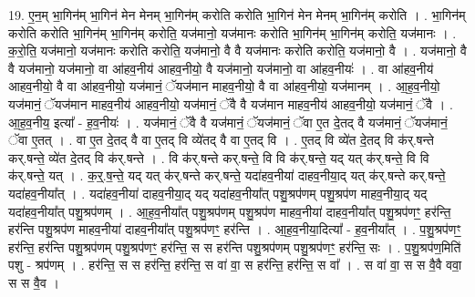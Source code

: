\documentclass[17pt]{extarticle}
\begin{document}
19. ए॒न॒म् भा॒गिन॑म् भा॒गिन॑ मेन मेनम् भा॒गिन॑म् करोति करोति भा॒गिन॑ मेन मेनम् भा॒गिन॑म् करोति । . भा॒गिन॑म् करोति करोति भा॒गिन॑म् भा॒गिन॑म् करोति॒ यज॑मानो॒ यज॑मानः करोति भा॒गिन॑म् भा॒गिन॑म् करोति॒ यज॑मानः । . क॒रो॒ति॒ यज॑मानो॒ यज॑मानः करोति करोति॒ यज॑मानो॒ वै वै यज॑मानः करोति करोति॒ यज॑मानो॒ वै । . यज॑मानो॒ वै वै यज॑मानो॒ यज॑मानो॒ वा आ॑हव॒नीय॑ आहव॒नीयो॒ वै यज॑मानो॒ यज॑मानो॒ वा आ॑हव॒नीयः॑ । . वा आ॑हव॒नीय॑ आहव॒नीयो॒ वै वा आ॑हव॒नीयो॒ यज॑मानं॒ ॅयज॑मान माहव॒नीयो॒ वै वा आ॑हव॒नीयो॒ यज॑मानम् । . आ॒ह॒व॒नीयो॒ यज॑मानं॒ ॅयज॑मान माहव॒नीय॑ आहव॒नीयो॒ यज॑मानं॒ ॅवै वै यज॑मान माहव॒नीय॑ आहव॒नीयो॒ यज॑मानं॒ ॅवै । . आ॒ह॒व॒नीय॒ इत्या᳚ - ह॒व॒नीयः॑ । . यज॑मानं॒ ॅवै वै यज॑मानं॒ ॅयज॑मानं॒ ॅवा ए॒त दे॒तद् वै यज॑मानं॒ ॅयज॑मानं॒ ॅवा ए॒तत् । . वा ए॒त दे॒तद् वै वा ए॒तद् वि व्ये॑तद् वै वा ए॒तद् वि । . ए॒तद् वि व्ये॑त दे॒तद् वि क॑र्.षन्ते कर्.षन्ते॒ व्ये॑त दे॒तद् वि क॑र्.षन्ते । . वि क॑र्.षन्ते कर्.षन्ते॒ वि वि क॑र्.षन्ते॒ यद् यत् क॑र्.षन्ते॒ वि वि क॑र्.षन्ते॒ यत् । . क॒र्॒.ष॒न्ते॒ यद् यत् क॑र्.षन्ते कर्.षन्ते॒ यदा॑हव॒नीया॑ दाहव॒नीया॒द् यत् क॑र्.षन्ते कर्.षन्ते॒ यदा॑हव॒नीया᳚त् । . यदा॑हव॒नीया॑ दाहव॒नीया॒द् यद् यदा॑हव॒नीया᳚त् पशु॒श्रप॑णम् पशु॒श्रप॑ण माहव॒नीया॒द् यद् यदा॑हव॒नीया᳚त् पशु॒श्रप॑णम् । . आ॒ह॒व॒नीया᳚त् पशु॒श्रप॑णम् पशु॒श्रप॑ण माहव॒नीया॑ दाहव॒नीया᳚त् पशु॒श्रप॑णꣳ॒॒ हर॑न्ति॒ हर॑न्ति पशु॒श्रप॑ण माहव॒नीया॑ दाहव॒नीया᳚त् पशु॒श्रप॑णꣳ॒॒ हर॑न्ति । . आ॒ह॒व॒नीया॒दित्या᳚ - ह॒व॒नीया᳚त् । . प॒शु॒श्रप॑णꣳ॒॒ हर॑न्ति॒ हर॑न्ति पशु॒श्रप॑णम् पशु॒श्रप॑णꣳ॒॒ हर॑न्ति॒ स स हर॑न्ति पशु॒श्रप॑णम् पशु॒श्रप॑णꣳ॒॒ हर॑न्ति॒ सः । . प॒शु॒श्रप॑ण॒मिति॑ पशु - श्रप॑णम् । . हर॑न्ति॒ स स हर॑न्ति॒ हर॑न्ति॒ स वा॑ वा॒ स हर॑न्ति॒ हर॑न्ति॒ स वा᳚ । . स वा॑ वा॒ स स वै॒वै ववा॒ स स वै॒व । \newline
\end{document}

